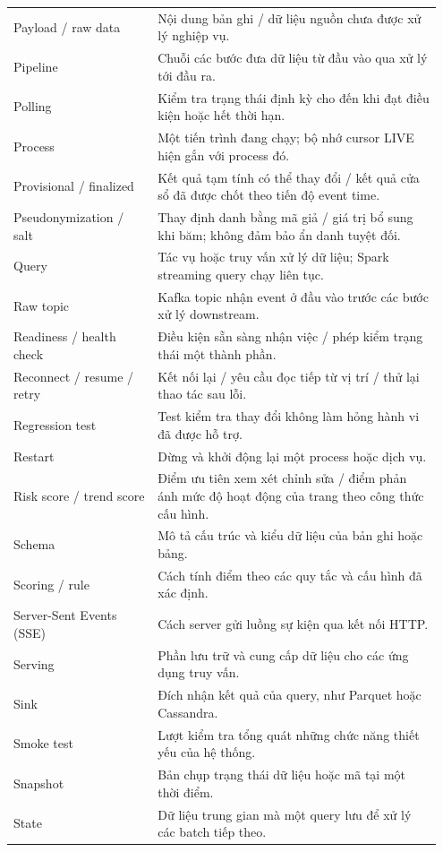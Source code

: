 \begin{longtable}{@{}p{0.32\linewidth}p{0.63\linewidth}@{}}
Payload / raw data & Nội dung bản ghi / dữ liệu nguồn chưa được xử lý nghiệp vụ. \\
Pipeline & Chuỗi các bước đưa dữ liệu từ đầu vào qua xử lý tới đầu ra. \\
Polling & Kiểm tra trạng thái định kỳ cho đến khi đạt điều kiện hoặc hết thời hạn. \\
Process & Một tiến trình đang chạy; bộ nhớ cursor LIVE hiện gắn với process đó. \\
Provisional / finalized & Kết quả tạm tính có thể thay đổi / kết quả cửa sổ đã được chốt theo tiến độ event time. \\
Pseudonymization / salt & Thay định danh bằng mã giả / giá trị bổ sung khi băm; không đảm bảo ẩn danh tuyệt đối. \\
Query & Tác vụ hoặc truy vấn xử lý dữ liệu; Spark streaming query chạy liên tục. \\
Raw topic & Kafka topic nhận event ở đầu vào trước các bước xử lý downstream. \\
Readiness / health check & Điều kiện sẵn sàng nhận việc / phép kiểm trạng thái một thành phần. \\
Reconnect / resume / retry & Kết nối lại / yêu cầu đọc tiếp từ vị trí / thử lại thao tác sau lỗi. \\
Regression test & Test kiểm tra thay đổi không làm hỏng hành vi đã được hỗ trợ. \\
Restart & Dừng và khởi động lại một process hoặc dịch vụ. \\
Risk score / trend score & Điểm ưu tiên xem xét chỉnh sửa / điểm phản ánh mức độ hoạt động của trang theo công thức cấu hình. \\
Schema & Mô tả cấu trúc và kiểu dữ liệu của bản ghi hoặc bảng. \\
Scoring / rule & Cách tính điểm theo các quy tắc và cấu hình đã xác định. \\
Server-Sent Events (SSE) & Cách server gửi luồng sự kiện qua kết nối HTTP. \\
Serving & Phần lưu trữ và cung cấp dữ liệu cho các ứng dụng truy vấn. \\
Sink & Đích nhận kết quả của query, như Parquet hoặc Cassandra. \\
Smoke test & Lượt kiểm tra tổng quát những chức năng thiết yếu của hệ thống. \\
Snapshot & Bản chụp trạng thái dữ liệu hoặc mã tại một thời điểm. \\
State & Dữ liệu trung gian mà một query lưu để xử lý các batch tiếp theo. \\

\end{longtable}
